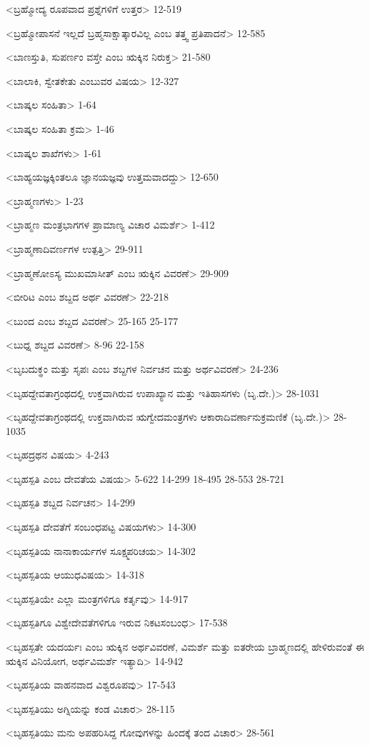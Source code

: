 <ಬ್ರಹ್ಮೋದ್ಯ ರೂಪವಾದ ಪ್ರಶ್ನೆಗಳಿಗೆ ಉತ್ತರ>
12-519

<ಬ್ರಹ್ಮೋಪಾಸನೆ ಇಲ್ಲದೆ ಬ್ರಹ್ಮಸಾಕ್ಷಾತ್ಕಾರವಿಲ್ಲ ಎಂಬ ತತ್ತ್ವ ಪ್ರತಿಪಾದನೆ>
12-585

<ಬಾಣಸ್ತುತಿ, ಸುಪರ್ಣಂ ವಸ್ತೇ ಎಂಬ ಋಕ್ಕಿನ ನಿರುಕ್ತ>
21-580

<ಬಾಲಾಕಿ, ಸ್ವೇತಕೇತು ಎಂಬುವರ ವಿಷಯ>
12-327

<ಬಾಷ್ಕಲ ಸಂಹಿತಾ>
1-64

<ಬಾಷ್ಕಲ ಸಂಹಿತಾ ಕ್ರಮ>
1-46

<ಬಾಷ್ಕಲ ಶಾಖೆಗಳು>
1-61

<ಬಾಹ್ಯಯಜ್ಞಕ್ಕಿಂತಲೂ ಜ್ಞಾನಯಜ್ಞವು ಉತ್ತಮವಾದದ್ದು>
12-650

<ಬ್ರಾಹ್ಮಣಗಳು>
1-23

<ಬ್ರಾಹ್ಮಣ ಮಂತ್ರಭಾಗಗಳ ಪ್ರಾಮಾಣ್ಯ ವಿಚಾರ ವಿಮರ್ಶೆ>
1-412

<ಬ್ರಾಹ್ಮಣಾದಿವರ್ಣಗಳ ಉತ್ಪತ್ತಿ>
29-911

<ಬ್ರಾಹ್ಮಣೋಽಸ್ಯ ಮುಖಮಾಸೀತ್‍ ಎಂಬ ಋಕ್ಕಿನ ವಿವರಣೆ>
29-909

<ಬೀರಿಟ ಎಂಬ ಶಬ್ದದ ಅರ್ಥ ವಿವರಣೆ>
22-218

<ಬುಂದ ಎಂಬ ಶಬ್ದದ ವಿವರಣೆ>
25-165
25-177

<ಬುಧ್ನ ಶಬ್ದದ ವಿವರಣೆ>
8-96
22-158

<ಬೃಬದುಕ್ಥಂ ಮತ್ತು ಸೃಪಃ ಎಂಬ ಶಬ್ದಗಳ ನಿರ್ವಚನ ಮತ್ತು ಅರ್ಥವಿವರಣೆ>
24-236

<ಬೃಹದ್ದೇವತಾಗ್ರಂಥದಲ್ಲಿ ಉಕ್ತವಾಗಿರುವ ಉಪಾಖ್ಯಾನ ಮತ್ತು ಇತಿಹಾಸಗಳು (ಬೃ.ದೇ.)>
28-1031

<ಬೃಹದ್ದೇವತಾಗ್ರಂಥದಲ್ಲಿ ಉಕ್ತವಾಗಿರುವ ಋಗ್ವೇದಮಂತ್ರಗಳು ಆಕಾರಾದಿವರ್ಣಾನುಕ್ರಮಣಿಕೆ (ಬೃ.ದೇ.)>
28-1035

<ಬೃಹದ್ರಥನ ವಿಷಯ>
4-243

<ಬೃಹಸ್ಪತಿ ಎಂಬ ದೇವತೆಯ ವಿಷಯ>
5-622 
14-299 
18-495 
28-553
28-721

<ಬೃಹಸ್ಪತಿ ಶಬ್ದದ ನಿರ್ವಚನ>
14-299

<ಬೃಹಸ್ಪತಿ ದೇವತೆಗೆ ಸಂಬಂಧಪಟ್ಟ ವಿಷಯಗಳು>
14-300

<ಬೃಹಸ್ಪತಿಯ ನಾನಾಕಾರ್ಯಗಳ ಸೂಕ್ಷ್ಮಪರಿಚಯ>
14-302

<ಬೃಹಸ್ಪತಿಯ ಆಯುಧವಿಷಯ>
14-318

<ಬೃಹಸ್ಪತಿಯೇ ಎಲ್ಲಾ ಮಂತ್ರಗಳಿಗೂ ಕರ್ತೃವು>
14-917

<ಬೃಹಸ್ಪತಿಗೂ ವಿಶ್ವೇದೇವತೆಗಳಿಗೂ ಇರುವ ನಿಕಟಸಂಬಂಧ>
17-538

<ಬೃಹಸ್ಪತೇ ಯದರ್ಯಃ ಎಂಬ ಋಕ್ಕಿನ ಅರ್ಥವಿವರಣೆ, ವಿಮರ್ಶೆ ಮತ್ತು ಐತರೇಯ ಬ್ರಾಹ್ಮಣದಲ್ಲಿ ಹೇಳಿರುವಂತೆ ಈ ಋಕ್ಕಿನ ವಿನಿಯೋಗ, ಅರ್ಥವಿಮರ್ಶೆ ಇತ್ಯಾದಿ>
14-942

<ಬೃಹಸ್ಪತಿಯ ವಾಹನವಾದ ವಿಶ್ವರೂಪವು>
17-543

<ಬೃಹಸ್ಪತಿಯು ಅಗ್ನಿಯನ್ನು ಕಂಡ ವಿಚಾರ>
28-115

<ಬೃಹಸ್ಪತಿಯು ಮನು ಅಪಹರಿಸಿದ್ದ ಗೋವುಗಳನ್ನು ಹಿಂದಕ್ಕೆ ತಂದ ವಿಚಾರ>
28-561

